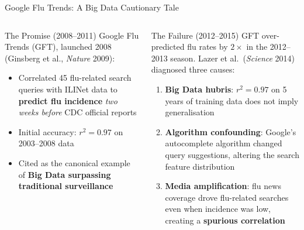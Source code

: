 \documentclass[aspectratio=169,10pt]{beamer}
\begin{document}
\begin{frame}{Google Flu Trends: A Big Data Cautionary Tale}
  \begin{columns}[T]
      \begin{block}{The Promise (2008--2011)}
        Google Flu Trends (GFT), launched 2008 (Ginsberg et al.,
        \textit{Nature} 2009):
        \begin{itemize}
          \item Correlated 45 flu-related search queries with
                ILINet data to \textbf{predict flu incidence}
                \emph{two weeks before} CDC official reports
          \item Initial accuracy: $r^2 = 0.97$ on 2003--2008 data
          \item Cited as the canonical example of
                \textbf{Big Data surpassing traditional surveillance}
        \end{itemize}
      \end{block}
      \vspace{5pt}
      \begin{alertblock}{The Failure (2012--2015)}
        GFT over-predicted flu rates by \textbf{$2\times$} in the
        2012--2013 season.
        Lazer et al.\ (\textit{Science} 2014) diagnosed three causes:
        \begin{enumerate}
          \item \textbf{Big Data hubris}: $r^2 = 0.97$ on 5 years
                of training data does not imply generalisation
          \item \textbf{Algorithm confounding}: Google's autocomplete
                algorithm changed query suggestions, altering
                the search feature distribution
          \item \textbf{Media amplification}: flu news coverage
                drove flu-related searches even when incidence
                was low, creating a \textbf{spurious correlation}
        \end{enumerate}
      \end{alertblock}


\end{columns}
\end{frame}
\end{document}
